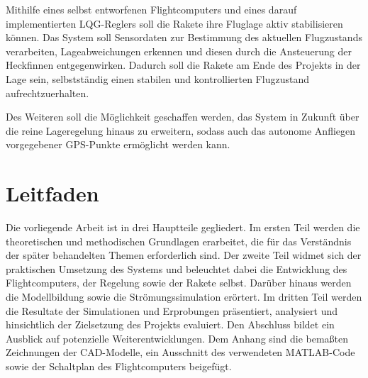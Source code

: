 Mithilfe eines selbst entworfenen Flightcomputers und eines darauf implementierten LQG-Reglers soll die Rakete ihre Fluglage aktiv stabilisieren können. Das System soll Sensordaten zur Bestimmung des aktuellen Flugzustands verarbeiten, Lageabweichungen erkennen und diesen durch die Ansteuerung der Heckfinnen entgegenwirken. Dadurch soll die Rakete am Ende des Projekts in der Lage sein, selbstständig einen stabilen und kontrollierten Flugzustand aufrechtzuerhalten.

Des Weiteren soll die Möglichkeit geschaffen werden, das System in Zukunft über die reine Lageregelung hinaus zu erweitern, sodass auch das autonome Anfliegen vorgegebener GPS-Punkte ermöglicht werden kann.

\chapter{Leitfaden}
Die vorliegende Arbeit ist in drei Hauptteile gegliedert. Im ersten Teil werden die theoretischen und methodischen Grundlagen erarbeitet, die für das Verständnis der später behandelten Themen erforderlich sind. Der zweite Teil widmet sich der praktischen Umsetzung des Systems und beleuchtet dabei die Entwicklung des Flightcomputers, der Regelung sowie der Rakete selbst. Darüber hinaus werden die Modellbildung sowie die Strömungssimulation erörtert. Im dritten Teil werden die Resultate der Simulationen und Erprobungen präsentiert, analysiert und hinsichtlich der Zielsetzung des Projekts evaluiert. Den Abschluss bildet ein Ausblick auf potenzielle Weiterentwicklungen.
Dem Anhang sind die  bemaßten Zeichnungen der CAD-Modelle, ein Ausschnitt des verwendeten MATLAB-Code sowie der Schaltplan des Flightcomputers beigefügt.
\cleardoublepage